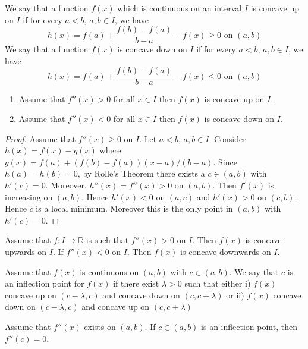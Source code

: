 
\begin{defn}[Concavity]
We say that a function $f(x)$ which is continuous on an interval $I$ is concave up on $I$ if for every $a< b$, $a,b \in I$, we have
\[h(x) = f(a) + \frac{f(b) - f(a)}{b-a} - f(x) \geq 0 \text{ on }(a,b)\]
We say that a function $f(x)$ is concave down on $I$ if for every $a< b$, $a,b \in I$, we have
\[h(x) = f(a) + \frac{f(b) - f(a)}{b-a} - f(x) \leq 0 \text{ on }(a,b)\]
\end{defn}

\begin{thm}\leavevmode

\begin{enumerate}
\item Assume that $f''(x) > 0$ for all $x\in I$ then $f(x)$ is concave up on $I$.
\item Assume that $f''(x) < 0$ for all $x\in I$ then $f(x)$ is concave down on $I$.
\end{enumerate}
\end{thm}

\begin{proof}
Assume that $f''(x) \geq 0$ on $I$. Let $a<b$, $a,b \in I$. Consider $h(x) = f(x) - g(x)$ where $g(x) = f(a) + (f(b)-f(a))(x-a)/(b-a)$. Since $h(a) = h(b) = 0$, by Rolle's Theorem there exists a $c \in (a,b)$ with $h'(c) = 0$. Moreover, $h''(x)= f''(x) > 0$ on $(a,b)$. Then $f'(x)$ is increasing on $(a,b)$. Hence $h'(x)<0$ on $(a,c)$ and $h'(x) > 0$ on $(c,b)$. Hence $c$ is a local minimum. Moreover this is the only point in $(a,b)$ with $h'(c) =0$. 
\end{proof}

\begin{thm}
Assume that $f \colon I\to \mathbb{R}$ is such that $f''(x) > 0$ on $I$. Then $f(x)$ is concave upwards on $I$. If $f''(x) < 0$ on $I$. Then $f(x)$ is concave downwards on $I$.
\end{thm}


\begin{defn}
Assume that $f(x)$ is continuous on $(a,b)$ with $c \in (a, b)$. We say that $c$ is an inflection point for $f(x)$ if there exist $\lambda > 0$ such that either i) $f(x)$ concave up on $( c - \lambda, c)$ and concave down on $(c, c+ \lambda)$ or  ii) $f(x)$ concave down on  $(c - \lambda, c)$ and concave up on $(c, c+ \lambda)$
\end{defn}

\begin{prop}
Assume that $f''(x)$ exists on $(a,b)$. If $c\in (a,b)$ is an inflection point, then $f''(c) = 0$.
\end{prop}


